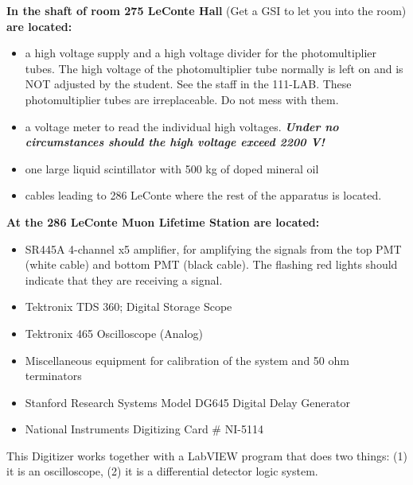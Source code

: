 \documentclass{../lab}
\begin{document}
\noindent\textbf{In the shaft of room 275 LeConte Hall} (Get a GSI to let you into the room) \textbf{are located:}

\newpage

\begin{itemize}
    \item a high voltage supply and a high voltage divider for the photomultiplier tubes. The high voltage of the photomultiplier tube normally is left on and is NOT adjusted by the student. See the staff in the 111-LAB. These photomultiplier tubes are irreplaceable. Do not mess with them.

    \item a voltage meter to read the individual high voltages. \emph{\textbf{Under no circumstances should the high voltage exceed 2200 V!}}

    \item one large liquid scintillator with 500 kg of doped mineral oil

    \item cables leading to 286 LeConte where the rest of the apparatus is located.
\end{itemize}

\noindent\textbf{At the 286 LeConte Muon Lifetime Station are located:}

\begin{itemize}
    \item SR445A 4-channel x5 amplifier, for amplifying the signals from the top PMT (white cable) and bottom PMT (black cable). The flashing red lights should indicate that they are receiving a signal.

    \item Tektronix TDS 360; Digital Storage Scope

    \item Tektronix 465 Oscilloscope (Analog)

    \item Miscellaneous equipment for calibration of the system and 50 ohm terminators

    \item Stanford Research Systems Model DG645 Digital Delay Generator

    \item National Instruments Digitizing Card \# NI-5114

\end{itemize}

\noindent This Digitizer works together with a LabVIEW program that does two things: (1) it is an oscilloscope, (2) it is a differential detector logic system.
\end{document}
